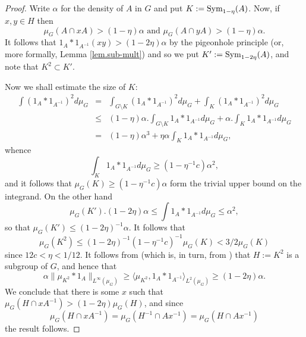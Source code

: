 \documentclass[12pt]{amsart}
\numberwithin{equation}{section}
\theoremstyle{plain}
\theoremstyle{definition}
\renewcommand{\leq}{\leqslant}
\renewcommand{\geq}{\geqslant}
\providecommand{\Sym}{\mathop{\rm Sym}\nolimits}
\begin{document}
\begin{proof}
Write $\alpha$ for the density of $A$ in $G$ and put $K:=\Sym_{1-\eta}(A)$.  Now, if $x,y \in H$ then
\begin{equation*}
\mu_G(A \cap xA) > (1-\eta)\alpha \textrm{ and } \mu_G(A \cap yA) > (1-\eta)\alpha.
\end{equation*}
It follows that $1_A \ast 1_{A^{-1}}(xy) > (1-2\eta)\alpha$ by the pigeonhole principle (or, more formally, Lemma \ref{lem.sub-mult}) and so we put $K':=\Sym_{1-2\eta}(A)$, and note that $K^2 \subset K'$.  

Now we shall estimate the size of $K$:
\begin{eqnarray*}
\int{(1_A \ast 1_{A^{-1}})^2d\mu_G} & = & \int_{G \setminus K}{(1_A \ast 1_{A^{-1}})^2d\mu_G}+\int_{K}{(1_A \ast 1_{A^{-1}})^2d\mu_G}\\ & \leq & (1-\eta)\alpha. \int_{G \setminus K}{1_A \ast 1_{A^{-1}}d\mu_G}+\alpha.\int_{K}{1_A \ast 1_{A^{-1}}d\mu_G}\\ & = &(1-\eta)\alpha^3 +\eta\alpha\int_{K}{1_A\ast 1_{A^{-1}}d\mu_G},
\end{eqnarray*}
whence
\begin{equation*}
\int_K{1_A \ast 1_{A^{-1}}d\mu_G} \geq (1-\eta^{-1}c)\alpha^2,
\end{equation*}
and it follows that $\mu_G(K) \geq (1-\eta^{-1}c)\alpha$ form the trivial upper bound on the integrand.  On the other hand
\begin{equation*}
\mu_G(K').(1-2\eta)\alpha \leq \int{1_A \ast 1_{A^{-1}}d\mu_G} \leq \alpha^2,
\end{equation*}
so that $\mu_G(K') \leq (1-2\eta)^{-1}\alpha$.  It follows that
\begin{equation*}
\mu_G(K^2) \leq (1-2\eta)^{-1}(1-\eta^{-1}c)^{-1}\mu_G(K)< 3/2\mu_G(K)
\end{equation*}
since $12c< \eta < 1/12$. It follows from \cite[Exercise 2.6.5]{TCTVHV} (which is, in turn, from \cite{IL}) that $H:=K^2$ is a subgroup of $G$, and hence that
\begin{equation*}
\alpha \|\mu_{K^2}\ast 1_A\|_{L^\infty(\mu_G)} \geq \langle \mu_{K^2},1_A \ast 1_{A^{-1}}\rangle_{L^2(\mu_G)} \geq (1-2\eta)\alpha.
\end{equation*}
We conclude that there is some $x$ such that $\mu_G(H\cap xA^{-1}) > (1-2\eta)\mu_G(H)$, and since
\begin{equation*}
\mu_G(H\cap xA^{-1}) =\mu_G(H^{-1}\cap Ax^{-1}) = \mu_G(H \cap Ax^{-1})
\end{equation*}
the result follows. 
\end{proof}
\end{document}
